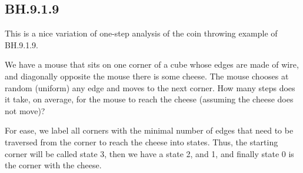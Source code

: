 \subsection{BH.9.1.9}
\label{sec:bh.9.1.9}



This is a nice variation of one-step analysis of the coin throwing example of BH.9.1.9.

We have a mouse that sits on one corner of a cube whose edges are made of wire, and  diagonally opposite the mouse there is some cheese.
The mouse chooses at random (uniform) any edge and moves to the next corner.
How many steps does it take, on average, for the mouse to reach the cheese (assuming the cheese does not move)?

For ease, we label all corners with the minimal number of edges that need to be traversed from the corner to reach the cheese into states. Thus, the starting corner will be called state 3, then we have a state 2, and 1, and finally state 0 is the corner with the cheese.

